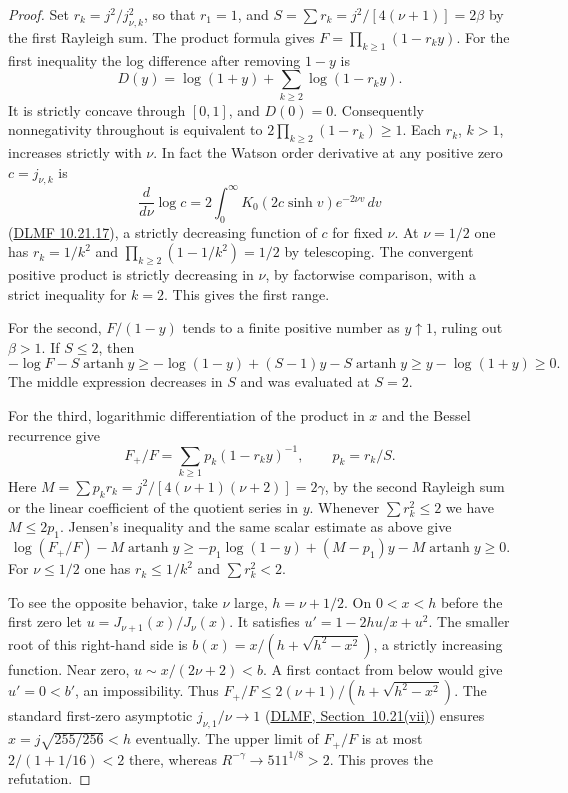 \documentclass[11pt,a4paper]{article}
\numberwithin{equation}{section}
\begin{document}
\begin{proof}
Set $r_k=j^2/j_{\nu,k}^2$, so that $r_1=1$, and
$S=\sum r_k=j^2/[4(\nu+1)]=2\beta$ by the first Rayleigh sum.
The product formula gives $F=\prod_{k\ge1}(1-r_k y)$.
For the first inequality the log difference after removing $1-y$ is
\[
 D(y)=\log(1+y)+\sum_{k\ge2}\log(1-r_k y).
\]
It is strictly concave through $[0,1]$, and $D(0)=0$. Consequently
nonnegativity throughout is equivalent to
$2\prod_{k\ge2}(1-r_k)\ge1$. Each $r_k$, $k>1$, increases strictly
with $\nu$. In fact the Watson order derivative at any positive zero
$c=j_{\nu,k}$ is
\[
 \frac{d}{d\nu}\log c
 =2\int_0^\infty K_0(2c\sinh v)e^{-2\nu v}\,dv
\]
(\href{https://dlmf.nist.gov/10.21.E17}{DLMF 10.21.17}), a strictly
decreasing function of $c$ for fixed $\nu$. At $\nu=1/2$ one has
$r_k=1/k^2$ and $\prod_{k\ge2}(1-1/k^2)=1/2$ by telescoping.
The convergent positive product is strictly decreasing in $\nu$, by
factorwise comparison, with a strict inequality for $k=2$. This gives
the first range.

For the second, $F/(1-y)$ tends to a finite positive number as
$y\uparrow1$, ruling out $\beta>1$. If $S\le2$, then
\[
 -\log F-S\operatorname{artanh}y
 \ge-\log(1-y)+(S-1)y-S\operatorname{artanh}y
 \ge y-\log(1+y)\ge0 .
\]
The middle expression decreases in $S$ and was evaluated at $S=2$.

For the third, logarithmic differentiation of the product in $x$
and the Bessel recurrence give
\[
 F_+/F=\sum_{k\ge1}p_k(1-r_k y)^{-1},\qquad p_k=r_k/S.
\]
Here $M=\sum p_k r_k=j^2/[4(\nu+1)(\nu+2)]=2\gamma$, by the second
Rayleigh sum or the linear coefficient of the quotient series in $y$.
Whenever $\sum r_k^2\le2$ we have $M\le2p_1$. Jensen's inequality
and the same scalar estimate as above give
\[
 \log(F_+/F)-M\operatorname{artanh}y
 \ge-p_1\log(1-y)+(M-p_1)y-M\operatorname{artanh}y\ge0.
\]
For $\nu\le1/2$ one has $r_k\le1/k^2$ and $\sum r_k^2<2$.

To see the opposite behavior, take $\nu$ large, $h=\nu+1/2$.
On $0<x<h$ before the first zero let $u=J_{\nu+1}(x)/J_\nu(x)$.
It satisfies $u'=1-2hu/x+u^2$. The smaller root of this right-hand
side is $b(x)=x/(h+\sqrt{h^2-x^2})$, a strictly increasing function.
Near zero, $u\sim x/(2\nu+2)< b$. A first contact from below would
give $u'=0<b'$, an impossibility. Thus $F_+/F\le
2(\nu+1)/(h+\sqrt{h^2-x^2})$. The standard first-zero asymptotic
$j_{\nu,1}/\nu\to1$ (\href{https://dlmf.nist.gov/10.21}{DLMF,
Section~10.21(vii)}) ensures $x=j\sqrt{255/256}<h$ eventually.
The upper limit of $F_+/F$ is at most $2/(1+1/16)<2$ there,
whereas $R^{-\gamma}\to511^{1/8}>2$. This proves the refutation.
\end{proof}
\end{document}

